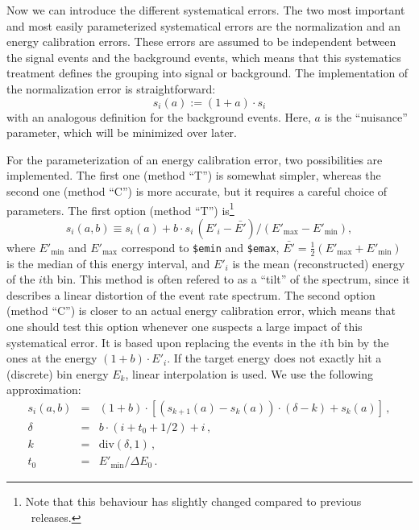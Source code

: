 Now we can introduce the different systematical errors. 
The two most important and
most easily parameterized systematical errors are the normalization 
and an energy calibration errors. These errors are assumed to be independent between the signal events and the background events, which means that
this systematics treatment defines the grouping into signal or background.
The implementation of the normalization error
is straightforward:
\begin{equation}
s_i(a):=(1+a)\cdot s_i
\end{equation} 
with an analogous definition for the background events. Here, $a$ is the ``nuisance'' parameter, which will be minimized over later.

For the parameterization of an energy calibration error, two possibilities
are implemented. The first one (method ``T'') is somewhat simpler, 
whereas the second one (method ``C'')
is more accurate, but it requires a careful choice of parameters. 
The first option (method ``T'') is\footnote{Note that this behaviour
has slightly changed compared to previous \GLOBES\ releases.}
\begin{equation}
  s_i(a,b) \equiv s_i(a)+b\cdot s_i \, (E'_i - \bar{E'}) / (E'_\mathrm{max}-E'_\mathrm{min}),
\end{equation}
where $E'_\mathrm{min}$ and $E'_\mathrm{max}$ correspond to {\tt \$emin} and
{\tt \$emax}, $\bar{E'} = \tfrac{1}{2} (E'_\mathrm{max}+E'_\mathrm{min})$ is
the median of this energy interval, and $E'_i$ is the mean (reconstructed)
energy of the $i$th bin.
This method is often refered to as a ``tilt'' of the
spectrum, since it describes a linear distortion 
of the event rate spectrum.
%
The second option (method ``C'') is closer to an actual energy
calibration error, which means that one should test this option whenever
one suspects a large impact of this systematical error.
It is based upon replacing the events in the $i$th bin
by the ones at the energy $(1+b)\cdot E'_i$. If the target energy does not exactly hit
a (discrete) bin energy $E_k$, linear interpolation is used. We use the following approximation:
\begin{eqnarray}
s_i(a,b)&=& (1+b)\cdot \left[ \left( s_{k+1}(a)-s_k(a) \right)\cdot (\delta-k) +s_k(a) \right] \,,
  \label{eq:Ecalib} \\
\delta&=&b\cdot(i+t_0+ 1/2)+i\,,\nonumber\\
k&=& \mathrm{div}(\delta,1)\,,\nonumber\\
t_0&=&E'_\mathrm{min}/\Delta E_0\,.\nonumber
\end{eqnarray}
